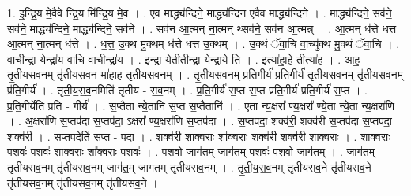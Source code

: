 \documentclass[17pt]{extarticle}
\begin{document}
1. इ॒न्द्रि॒य मे॒वैवे न्द्रि॒य मि॑न्द्रि॒य मे॒व । . ए॒व माद्ध्य॑न्दिने॒ माद्ध्य॑न्दिन ए॒वैव माद्ध्य॑न्दिने । . माद्ध्य॑न्दिने॒ सव॑ने॒ सव॑ने॒ माद्ध्य॑न्दिने॒ माद्ध्य॑न्दिने॒ सव॑ने । . सव॑न आ॒त्मन् ना॒त्मन् थ्सव॑ने॒ सव॑न आ॒त्मन्न् । . आ॒त्मन् ध॑त्ते धत्त आ॒त्मन् ना॒त्मन् ध॑त्ते । . ध॒त्त॒ उ॒क्थ मु॒क्थम् ध॑त्ते धत्त उ॒क्थम् । . उ॒क्थं ॅवा॒चि वा॒च्यु॑क्थ मु॒क्थं ॅवा॒चि । . वा॒चीन्द्रा॒ येन्द्रा॑य वा॒चि वा॒चीन्द्रा॑य । . इन्द्रा॒ येतीतीन्द्रा॒ येन्द्रा॒ये ति॑ । . इत्या॑हा॒हे तीत्या॑ह । . आ॒ह॒ तृ॒ती॒य॒स॒व॒नम् तृ॑तीयसव॒न मा॑हाह तृतीयसव॒नम् । . तृ॒ती॒य॒स॒व॒नम् प्र॑ति॒गीर्य॑ प्रति॒गीर्य॑ तृतीयसव॒नम् तृ॑तीयसव॒नम् प्र॑ति॒गीर्य॑ । . तृ॒ती॒य॒स॒व॒नमिति॑ तृतीय - स॒व॒नम् । . प्र॒ति॒गीर्य॑ स॒प्त स॒प्त प्र॑ति॒गीर्य॑ प्रति॒गीर्य॑ स॒प्त । . प्र॒ति॒गीर्येति॑ प्रति - गीर्य॑ । . स॒प्तैता न्ये॒तानि॑ स॒प्त स॒प्तैतानि॑ । . ए॒ता न्य॒क्षरा᳚ ण्य॒क्षरा᳚ ण्ये॒ता न्ये॒ता न्य॒क्षरा॑णि । . अ॒क्षरा॑णि स॒प्तप॑दा स॒प्तप॑दा॒ ऽक्षरा᳚ ण्य॒क्षरा॑णि स॒प्तप॑दा । . स॒प्तप॑दा॒ शक्व॑री॒ शक्व॑री स॒प्तप॑दा स॒प्तप॑दा॒ शक्व॑री । . स॒प्तप॒देति॑ स॒प्त - प॒दा॒ । . शक्व॑री शाक्व॒राः शा᳚क्व॒राः शक्व॑री॒ शक्व॑री शाक्व॒राः । . शा॒क्व॒राः प॒शवः॑ प॒शवः॑ शाक्व॒राः शा᳚क्व॒राः प॒शवः॑ । . प॒शवो॒ जाग॑त॒म् जाग॑तम् प॒शवः॑ प॒शवो॒ जाग॑तम् । . जाग॑तम् तृतीयसव॒नम् तृ॑तीयसव॒नम् जाग॑त॒म् जाग॑तम् तृतीयसव॒नम् । . तृ॒ती॒य॒स॒व॒नम् तृ॑तीयसव॒ने तृ॑तीयसव॒ने तृ॑तीयसव॒नम् तृ॑तीयसव॒नम् तृ॑तीयसव॒ने । \newline
\end{document}
